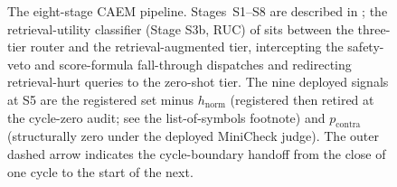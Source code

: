 \begin{figure}[p]
{%
}
\caption{%
The eight-stage CAEM pipeline. Stages~S1--S8 are described in ; the retrieval-utility classifier (Stage S3b, RUC) of  sits between the three-tier router and the retrieval-augmented tier, intercepting the safety-veto and score-formula fall-through dispatches and redirecting retrieval-hurt queries to the zero-shot tier. The nine deployed signals at S5 are the registered set minus $h_{\text{norm}}$ (registered then retired at the cycle-zero audit; see the list-of-symbols footnote) and $p_{\text{contra}}$ (structurally zero under the deployed MiniCheck judge). The outer dashed arrow indicates the cycle-boundary handoff from the close of one cycle to the start of the next.}
\label{fig:system-architecture}
\end{figure}
